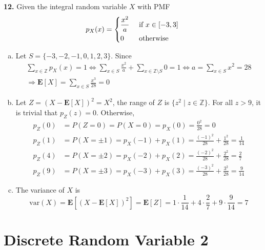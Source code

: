 \documentclass[a4paper,12pt]{article}
\newcommand{\E}{\mathbf E}
\newcommand{\var}{\mathrm{var}}
\newcommand{\exercise}[1]{\noindent\textbf{#1.}}
\begin{document}
\exercise{12} Given the integral random variable $X$ with PMF
\[p_X(x) = \begin{dcases}
  \frac{x^2}{a} &\text{ if } x \in [-3, 3]\\
  0 &\text{ otherwise}
\end{dcases}\]
\begin{enumerate}[(a)]
  \item Let $S = \{-3, -2, -1, 0, 1, 2, 3\}$. Since
    \begin{multline*}
      \sum_{x\in\mathbb Z}p_X(x) = 1
      \iff \sum_{x\in S}\frac{x^2}{a} + \sum_{x\in\mathbb Z\setminus S}0 = 1
      \iff a = \sum_{x\in S}x^2 = 28\\
      \Longrightarrow \E[X] = \sum_{x\in S}\frac{x^3}{28} = 0
    \end{multline*}
  \item Let $Z = (X - \E[X])^2 = X^2$,
    the range of $Z$ is $\{z^2\mid z\in\mathbb Z\}$.
    For all $z > 9$, it is trivial that $p_Z(z) = 0$.  Otherwise,
    \begin{align*}
      p_Z(0) &= P(Z = 0) = P(X=0) = p_X(0) = \frac{0^2}{28} = 0\\
      p_Z(1) &= P(X = \pm 1) = p_X(-1) + p_X(1)
      = \frac{(-1)^2}{28} + \frac{1^2}{28} = \frac{1}{14}\\
      p_Z(4) &= P(X = \pm 2) = p_X(-2) + p_X(2)
      = \frac{(-2)^2}{28} + \frac{2^2}{28} = \frac{2}{7}\\
      p_Z(9) &= P(X = \pm 3) = p_X(-3) + p_X(3)
      = \frac{(-3)^2}{28} + \frac{3^2}{28} = \frac{9}{14}
    \end{align*}
  \item The variance of $X$ is
    \[\var(X) = \E\left[(X - \E[X])^2\right]
    = \E[Z] = 1\cdot\frac{1}{14} + 4\cdot\frac{2}{7} + 9\cdot\frac{9}{14} = 7\]
\end{enumerate}
\pagebreak

\section{Discrete Random Variable 2}
\end{document}
